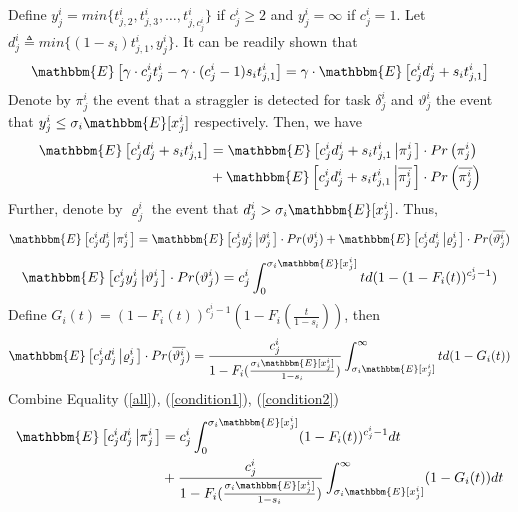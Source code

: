 \documentclass[10pt,conference]{IEEEtran}
\begin{document}
Define $y^i_j = min\{t^i_{j,2},t^i_{j,3},\dots,t^i_{j,c^i_j}\}$ if $c^i_j \geq 2$ and $y^i_j = \infty$ if $c^i_j = 1$.  Let $d^i_j \triangleq min\{(1 - s_i) t^i_{j,1}, y^i_j\}$. It can be readily shown that
\begin{equation}
\mathbbm{E} \left[ \gamma \cdot c^i_j t^i_j   - \gamma \cdot (c^i_j - 1)  s_i t^i_{j,1} \right] = \gamma \cdot  \mathbbm{E} \left[  c^i_j  d^i_j + s_i  t^i_{j,1} \right]
\end{equation}
Denote by $\pi^i_j$ the event that a straggler is detected for task $\delta^i_j$ and $\vartheta^i_j$ the event that $y^i_j \leq  \sigma_i  \mathbbm{E}[x^i_j]$ respectively. Then, we have
\begin{equation}
\begin{split}
 \mathbbm{E} \left[ c^i_j  d^i_j + s_i  t^i_{j,1}\right] &=\mathbbm{E} \left[ c^i_j  d^i_j   +s_i t^i_{j,1} \left|  \pi^i_j \right.\right]  \cdot Pr \left (\pi^i_j \right)  \\
 & + \mathbbm{E} \left[ c^i_j  d^i_j + s_i  t^i_{j,1}  \left|  \overline{\pi^i_j} \right.\right]  \cdot Pr \left (\overline{\pi^i_j} \right)
 \end{split}
\end{equation}
Further, denote by  $\varrho^i_j$  the event that $d^i_j >  \sigma_i  \mathbbm{E}[x^i_j]$. Thus,
\begin{equation}
 \mathbbm{E} \left[c^i_j  d^i_j  \left|  \pi^i_j \right.\right] = \mathbbm{E} \left[c^i_j  y^i_j  \left|  \vartheta^i_j \right.\right] \cdot Pr(\vartheta^i_j) + \mathbbm{E} \left[c^i_j  d^i_j  \left|  \varrho^i_j \right.\right] \cdot Pr(\overline{\vartheta^i_j})
 \label{all}
\end{equation}
\begin{equation}
  \mathbbm{E} \left[c^i_j  y^i_j  \left|  \vartheta^i_j \right.\right] \cdot Pr(\vartheta^i_j) = c^i_j \int_{0}^{\sigma_i \mathbbm{E}[x^i_j]} t d(1-(1-F_i(t))^{c^i_j - 1})
  \label{condition1}
\end{equation}
Define $G_i(t) = (1-F_i(t))^{c^i_j - 1}(1-F_i(\frac{t}{1-s_i}))$, then
\begin{equation}
 \mathbbm{E} \left[c^i_j  d^i_j  \left|  \varrho^i_j \right.\right] \cdot Pr(\overline{\vartheta^i_j}) =\frac{ c^i_j}{1-F_i(\frac{\sigma_i \mathbbm{E}[x^i_j]}{1-s_i})} \int_{\sigma_i \mathbbm{E}[x^i_j]}^{\infty} t d(1-G_i(t))
 \label{condition2}
\end{equation}
Combine Equality (\ref{all}), (\ref{condition1}), (\ref{condition2})
\begin{equation}
\begin{split}
\mathbbm{E} \left[c^i_j  d^i_j  \left|  \pi^i_j \right.\right] &= c^i_j\int_{0}^{\sigma_i \mathbbm{E}[x^i_j]}(1-F_i(t))^{c^i_j-1}dt\\ & + \frac{ c^i_j}{1-F_i(\frac{\sigma_i \mathbbm{E}[x^i_j]}{1-s_i})} \int_{\sigma_i \mathbbm{E}[x^i_j]}^{\infty}(1-G_i(t))dt
\end{split}
\end{equation}
\end{document}
